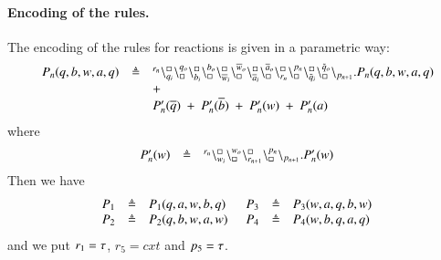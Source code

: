\paragraph{Encoding of the rules.}
The encoding of the rules for reactions is  given in a parametric way:
\[
\begin{array}{lcl}
P_n(q,b,w,a,q) & \triangleq & {}^{r_n}\backslash_{q_i}^{\scriptstyle {\square}}\backslash_{\scriptstyle {\square}}^{q_o}
                                                    \backslash_{b_i}^{\scriptstyle {\square}}\backslash_{\scriptstyle {\square}}^{b_o}
                                                     \backslash_{\overline{w}_i}^{\scriptstyle {\square}}\backslash_{\scriptstyle {\square}}^{\overline{w}_o}
					        \backslash_{\overline{a}_i}^{\scriptstyle {\square}}\backslash_{\scriptstyle {\square}}^{\overline{a}_o}
					        \backslash_{r_n}^{\scriptstyle {\square}}\backslash_{\scriptstyle {\square}}^{p_n}
					        \backslash_{\tilde{q}_i}^{\scriptstyle {\square}}\backslash_{\scriptstyle {\square}}^{\tilde{q}_o}
			\backslash_{p_{n+1}}.P_n(q,b,w,a,q)  \\
			&& +\\
			&&P_n'(\overline{q}) \ +\ P_n'(\overline{b}) \ + \ P_n'(w)\ +\ P_n'(a)\\
			\end{array}
			\]
			\noindent
			where
			\[
\begin{array}{lcl}
P_n'(w) &\triangleq &  {}^{r_n}\backslash_{w_i}^{\scriptstyle {\square}}\backslash_{\scriptstyle {\square}}^{w_o}\backslash_{r_{n+1}}^{\scriptstyle {\square}}\backslash_{\scriptstyle {\square}}^{p_n} \backslash_{p_{n+1}}.P_n'(w) 
\end{array}
\]
\noindent
Then we have 
\[
\begin{array}{lcl @{\hspace{0.5cm}}lcl  }
P_1 & \defeq & P_1(q,a,w,b,q) & P_3 & \defeq & P_3(w,a,q,b,w)  \\
P_2 & \defeq & P_2(q,b,w,a,w) &P_4 & \defeq & P_4(w,b,q,a,q) 
\end{array}
\]
\noindent
and we put $r_1 = \tau$, $r_5 = cxt$ and  $p_5 = \tau$.

